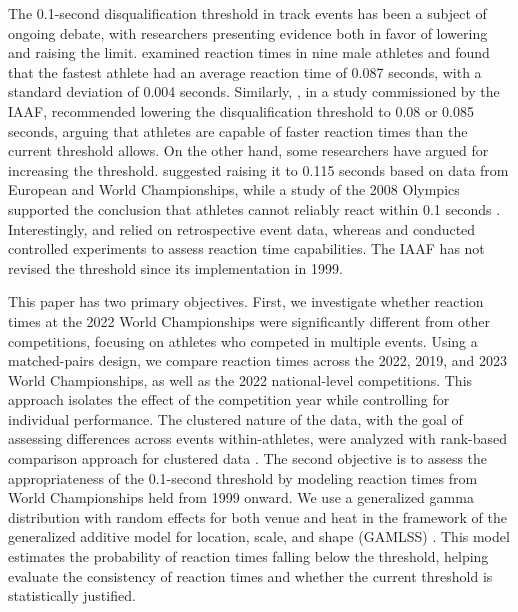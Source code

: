 \documentclass[12pt, letterpaper]{article}
\begin{document}
The 0.1-second disqualification threshold in track events has been 
a subject of ongoing debate, with researchers presenting evidence 
both in favor of lowering and raising the
limit. \citet{pain2007sprint} examined
reaction times in nine male athletes and found that the fastest athlete 
had an average reaction time of 0.087 seconds, with a standard deviation 
of 0.004 seconds. Similarly, \citet{komi2009iaaf}, in a study commissioned 
by the IAAF, recommended lowering the disqualification threshold to 0.08 
or 0.085 seconds, arguing that athletes are capable of faster reaction 
times than the current threshold allows. On the other hand, some 
researchers have argued for increasing the threshold.
\citet{brosnan2017effects} suggested raising it to 0.115 seconds based
on data from European and World Championships, while a study of the
2008 Olympics supported the conclusion that athletes cannot reliably
react within 0.1 seconds \citep{lipps2011implications}. Interestingly,
\citet{brosnan2017effects} and \citet{lipps2011implications} relied on
retrospective event data, whereas \citet{pain2007sprint} and
\citet{komi2009iaaf} conducted controlled experiments to assess
reaction time capabilities. The IAAF has not revised the threshold
since its implementation in 1999.


This paper has two primary objectives. First, we investigate whether 
reaction times at the 2022 World Championships were significantly 
different from other competitions, focusing on athletes who competed 
in multiple events. Using a matched-pairs design, we compare reaction 
times across the 2022, 2019, and 2023 World Championships, as well as 
the 2022 national-level competitions. This approach isolates the 
effect of the competition year while controlling for individual 
performance. The clustered nature of the data, with the goal of
assessing differences across events within-athletes, were analyzed
with rank-based comparison approach for clustered data
\citep{datta2005rank}. The second objective is to assess the 
appropriateness of the 0.1-second threshold by modeling reaction 
times from World Championships held from 1999 onward. We use a
generalized gamma distribution with random effects for both venue and
heat in the framework of the generalized additive model for location,
scale, and shape (GAMLSS) \citep{stasinopoulos2024generalized}.
This model estimates the probability of reaction times falling below 
the threshold, helping evaluate the consistency of reaction times and 
whether the current threshold is statistically justified.
\end{document}
